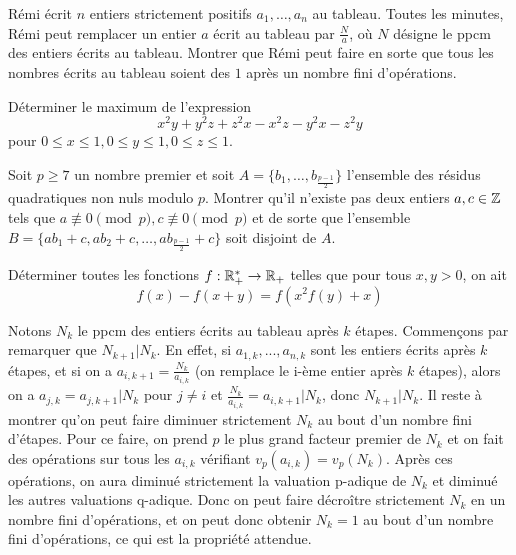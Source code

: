 

\begin{exo}
Rémi écrit $n$ entiers strictement positifs $a_1,\ldots,a_n$ au tableau. Toutes les minutes, Rémi peut remplacer un entier $a$ écrit au tableau par $\frac Na$, où $N$ désigne le ppcm des entiers écrits au tableau. Montrer que Rémi peut faire en sorte que tous les nombres écrits au tableau soient des $1$ après un nombre fini d'opérations.
\end{exo}


\begin{exo}
Déterminer le maximum de l'expression
$$x^2y + y^2z + z^2x - x^2z - y^2x - z^2y$$
pour $0\le x\le 1, 0\le y\le 1, 0\le z \le 1$.
\end{exo}


\begin{exo}
Soit $p\ge 7$ un nombre premier et soit $A = \{b_1, \dots, b_{\frac{p-1}{2}}\}$ l'ensemble des résidus quadratiques non nuls modulo $p$. Montrer qu'il n'existe pas deux entiers $a, c\in \mathbb Z$ tels que $a \not\equiv 0\pmod p, c\not \equiv 0 \pmod p$ et de sorte que l'ensemble $B=\{ab_1+c,ab_2+c,\ldots,ab_{\frac{p-1}{2}}+c\}$ soit disjoint de $A$. 
\end{exo}

\begin{exo}
Déterminer toutes les fonctions $f : \mathbb R_+^* \rightarrow \mathbb R_+$ telles que pour tous $x,y>0$, on ait
$$f(x) - f(x + y) = f(x^2f(y) + x)$$
\end{exo}




\begin{sol}
Notons $N_k$ le ppcm des entiers écrits au tableau après $k$ étapes. Commençons par remarquer que $N_{k+1}|N_k$. En effet, si $a_{1,k},...,a_{n,k}$ sont les entiers écrits après $k$ étapes, et si on a $a_{i,k+1}=\frac{N_k}{a_{i,k}}$ (on remplace le i-ème entier après $k$ étapes), alors on a $a_{j,k}=a_{j,k+1}|N_k$ pour $j\ne i$ et $\frac{N_k}{a_{i,k}}=a_{i,k+1}|N_k$, donc $N_{k+1}|N_k$. Il reste à montrer qu'on peut faire diminuer strictement $N_k$ au bout d'un nombre fini d'étapes. Pour ce faire, on prend $p$ le plus grand facteur premier de $N_k$ et on fait des opérations sur tous les $a_{i,k}$ vérifiant $v_p(a_{i,k})=v_p(N_k)$. Après ces opérations, on aura diminué strictement la valuation p-adique de $N_k$ et diminué les autres valuations q-adique. Donc on peut faire décroître strictement $N_k$ en un nombre fini d'opérations, et on peut donc obtenir $N_k=1$ au bout d'un nombre fini d'opérations, ce qui est la propriété attendue.
\end{sol}


